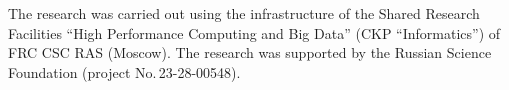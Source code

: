     
    
    


\Ack
    \noindent
    The research was carried out using the infrastructure of the Shared Research 
Facilities ``High Performance Computing and Big Data'' (CKP ``Informatics'') of 
FRC CSC RAS (Moscow). The research was supported by the Russian Science Foundation (project  
No.\,23-28-00548).
 

